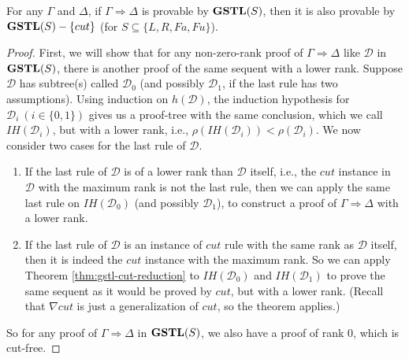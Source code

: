 \begin{thm}\label{thm:gstl-cut-elim}
	For any $\Gamma$ and $\Delta$, if $\Gamma \Rightarrow \Delta$ is provable by $\mathbf{GSTL}(S)$, then it is also provable by $\mathbf{GSTL}(S)-\{cut\}$ (for $S \subseteq \{ L, R, Fa, Fu \}$).
\end{thm}
\begin{proof}
		First, we will show that for any non-zero-rank proof of $\Gamma \Rightarrow \Delta$ like $\mathcal{D}$ in $\mathbf{GSTL}(S)$, there is another proof of the same sequent with a lower rank. Suppose $\mathcal{D}$ has subtree(s) called $\mathcal{D}_0$ (and possibly $\mathcal{D}_1$, if the last rule has two assumptions). Using induction on $h(\mathcal{D})$, the induction hypothesis for $\mathcal{D}_i ~(i \in \{0,1\})$ gives us a proof-tree with the same conclusion, which we call $IH(\mathcal{D}_i)$, but with a lower rank, i.e., $\rho(IH(\mathcal{D}_i)) < \rho(\mathcal{D}_i)$. We now consider two cases for the last rule of $\mathcal{D}$.

	\begin{enumerate}[label=\Roman*]
		\item If the last rule of $\mathcal{D}$ is of a lower rank than $\mathcal{D}$ itself, i.e., the $cut$ instance in $\mathcal{D}$ with the maximum rank is not the last rule, then we can apply the same last rule on $IH(\mathcal{D}_0)$ (and possibly $\mathcal{D}_1$), to construct a proof of $\Gamma \Rightarrow \Delta$ with a lower rank.
		
		\item If the last rule of $\mathcal{D}$ is an instance of $cut$ rule with the same rank as $\mathcal{D}$ itself, then it is indeed the $cut$ instance with the maximum rank. So we can apply Theorem \ref{thm:gstl-cut-reduction} to $IH(\mathcal{D}_0)$ and $IH(\mathcal{D}_1)$ to prove the same sequent as it would be proved by $cut$, but with a lower rank. (Recall that $\nabla cut$ is just a generalization of $cut$, so the theorem applies.)
	\end{enumerate}
	So for any proof of $\Gamma \Rightarrow \Delta$ in $\mathbf{GSTL}(S)$, we also have a proof of rank $0$, which is cut-free.
\end{proof}